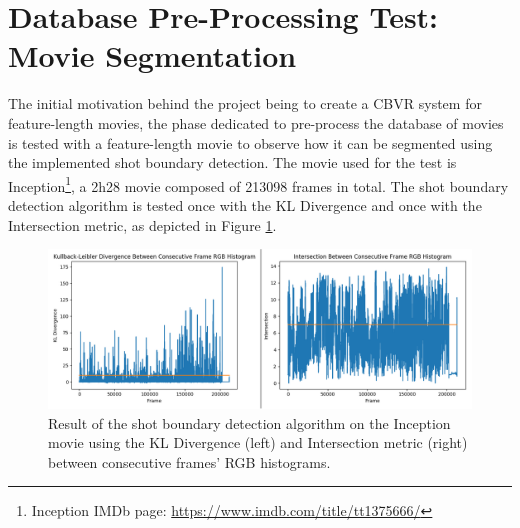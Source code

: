 
\section{Database Pre-Processing Test: Movie Segmentation}

The initial motivation behind the project being to create a CBVR system for feature-length movies, the phase dedicated to pre-process the database of movies is tested with a feature-length movie to observe how it can be segmented using the implemented shot boundary detection. The movie used for the test is Inception\footnote{Inception IMDb page: \url{https://www.imdb.com/title/tt1375666/}}, a 2h28 movie composed of 213098 frames in total. The shot boundary detection algorithm is tested once with the KL Divergence and once with the Intersection metric, as depicted in Figure \ref{fig:evaluation-inception_shot_boundary_detection_test}.\\

\begin{figure}[h] 
\centerline{\includegraphics[width=1.15\textwidth]{figures/evaluation/inception_shot_boundary_detection_test.png}}
\caption{\label{fig:evaluation-inception_shot_boundary_detection_test}Result of the shot boundary detection algorithm on the Inception movie using the KL Divergence (left) and Intersection metric (right) between consecutive frames' RGB histograms.}
\end{figure}

